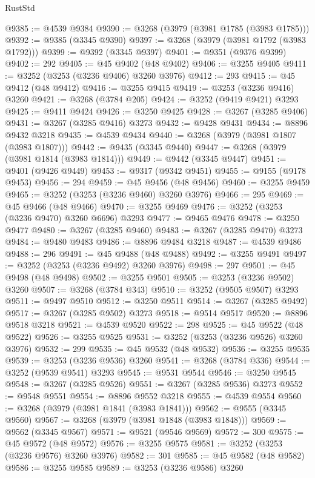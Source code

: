 \begin{lexlean}{RustStd}
\begin{coremodule}
@9385 := @4539 @9384
@9390 := @3268 (@3979 (@3981 @1785 (@3983 @1785)))
@9392 := @9385 (@3345 @9390)
@9397 := @3268 (@3979 (@3981 @1792 (@3983 @1792)))
@9399 := @9392 (@3345 @9397)
@9401 := @9351 (@9376 @9399)
@9402 := 292
@9405 := @45 @9402 (@48 @9402)
@9406 := @3255 @9405
@9411 := @3252 (@3253 (@3236 @9406) @3260 @3976)
@9412 := 293
@9415 := @45 @9412 (@48 @9412)
@9416 := @3255 @9415
@9419 := @3253 (@3236 @9416) @3260
@9421 := @3268 (@3784 @205)
@9424 := @3252 (@9419 @9421) @3293
@9425 := @9411 @9424
@9426 := @3250 @9425
@9428 := @3267 (@3285 @9406)
@9431 := @3267 (@3285 @9416) @3273
@9432 := @9428 @9431
@9434 := @8896 @9432 @3218
@9435 := @4539 @9434
@9440 := @3268 (@3979 (@3981 @1807 (@3983 @1807)))
@9442 := @9435 (@3345 @9440)
@9447 := @3268 (@3979 (@3981 @1814 (@3983 @1814)))
@9449 := @9442 (@3345 @9447)
@9451 := @9401 (@9426 @9449)
@9453 := @9317 (@9342 @9451)
@9455 := @9155 (@9178 @9453)
@9456 := 294
@9459 := @45 @9456 (@48 @9456)
@9460 := @3255 @9459
@9465 := @3252 (@3253 (@3236 @9460) @3260 @3976)
@9466 := 295
@9469 := @45 @9466 (@48 @9466)
@9470 := @3255 @9469
@9476 := @3252 (@3253 (@3236 @9470) @3260 @6696) @3293
@9477 := @9465 @9476
@9478 := @3250 @9477
@9480 := @3267 (@3285 @9460)
@9483 := @3267 (@3285 @9470) @3273
@9484 := @9480 @9483
@9486 := @8896 @9484 @3218
@9487 := @4539 @9486
@9488 := 296
@9491 := @45 @9488 (@48 @9488)
@9492 := @3255 @9491
@9497 := @3252 (@3253 (@3236 @9492) @3260 @3976)
@9498 := 297
@9501 := @45 @9498 (@48 @9498)
@9502 := @3255 @9501
@9505 := @3253 (@3236 @9502) @3260
@9507 := @3268 (@3784 @343)
@9510 := @3252 (@9505 @9507) @3293
@9511 := @9497 @9510
@9512 := @3250 @9511
@9514 := @3267 (@3285 @9492)
@9517 := @3267 (@3285 @9502) @3273
@9518 := @9514 @9517
@9520 := @8896 @9518 @3218
@9521 := @4539 @9520
@9522 := 298
@9525 := @45 @9522 (@48 @9522)
@9526 := @3255 @9525
@9531 := @3252 (@3253 (@3236 @9526) @3260 @3976)
@9532 := 299
@9535 := @45 @9532 (@48 @9532)
@9536 := @3255 @9535
@9539 := @3253 (@3236 @9536) @3260
@9541 := @3268 (@3784 @336)
@9544 := @3252 (@9539 @9541) @3293
@9545 := @9531 @9544
@9546 := @3250 @9545
@9548 := @3267 (@3285 @9526)
@9551 := @3267 (@3285 @9536) @3273
@9552 := @9548 @9551
@9554 := @8896 @9552 @3218
@9555 := @4539 @9554
@9560 := @3268 (@3979 (@3981 @1841 (@3983 @1841)))
@9562 := @9555 (@3345 @9560)
@9567 := @3268 (@3979 (@3981 @1848 (@3983 @1848)))
@9569 := @9562 (@3345 @9567)
@9571 := @9521 (@9546 @9569)
@9572 := 300
@9575 := @45 @9572 (@48 @9572)
@9576 := @3255 @9575
@9581 := @3252 (@3253 (@3236 @9576) @3260 @3976)
@9582 := 301
@9585 := @45 @9582 (@48 @9582)
@9586 := @3255 @9585
@9589 := @3253 (@3236 @9586) @3260

\end{coremodule}
\end{lexlean}
